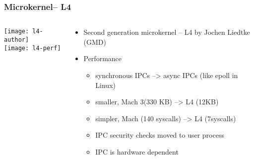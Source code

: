 \begin{frame}[plain]
    \frametitle{Microkernel-- L4}
    
    \begin{columns}
        
        \begin{column}{.4\textwidth}
            \centering
            \texttt{[image: l4-author]}
            \\
            \texttt{[image: l4-perf]}
        \end{column}
        
        \begin{column}{.6\textwidth}
            
            \begin{itemize}
                \item Second generation microkernel -- L4 by Jochen Liedtke (GMD)
                \item Performance
                \begin{itemize}
                    \item synchronous IPCs  -->  async IPCs (like epoll in Linux)
                    \item smaller, Mach 3(330 KB) --> L4 (12KB)
                    \item simpler, Mach (140 syscalls) --> L4 (7syscalls)
                    \item IPC security checks moved to user process
                    \item IPC is hardware dependent
                \end{itemize}		
            \end{itemize}	
            
        \end{column}
        
        
    \end{columns}
    
\end{frame}


